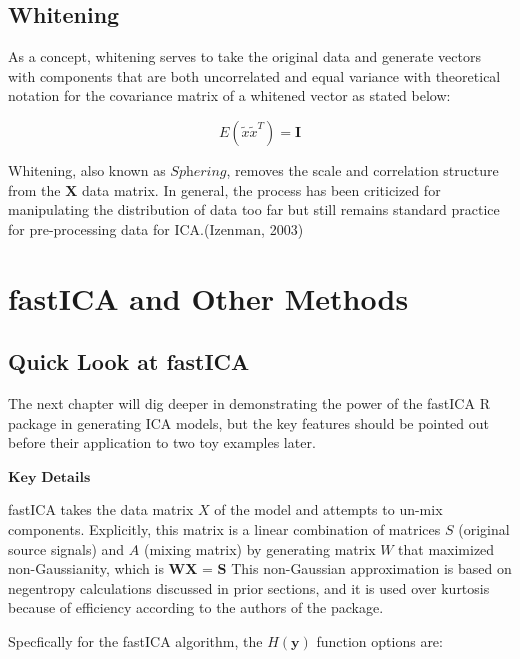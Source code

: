 \documentclass[12pt,twoside]{amherstthesis}
\begin{document}
  \subsection{Whitening}\label{whitening}
  
  As a concept, whitening serves to take the original data and generate
  vectors with components that are both uncorrelated and equal variance
  with theoretical notation for the covariance matrix of a whitened vector
  as stated below:
  
  \[ E(\tilde{x} \tilde{x}^T)= \textbf{I} \]
  
  Whitening, also known as \(\textit{Sphering}\), removes the scale and
  correlation structure from the \(\textbf{X}\) data matrix. In general,
  the process has been criticized for manipulating the distribution of
  data too far but still remains standard practice for pre-processing data
  for ICA.(Izenman, 2003)
  
  \section{fastICA and Other Methods}\label{fastica-and-other-methods}
  
  \subsection{Quick Look at fastICA}\label{quick-look-at-fastica}
  
  The next chapter will dig deeper in demonstrating the power of the
  fastICA R package in generating ICA models, but the key features should
  be pointed out before their application to two toy examples later.
  
  \(\textbf{Key Details}\) \newline
  
  fastICA takes the data matrix \(X\) of the model and attempts to un-mix
  components. Explicitly, this matrix is a linear combination of matrices
  \(S\) (original source signals) and \(A\) (mixing matrix) by generating
  matrix \(W\) that maximized non-Gaussianity, which is
  \(\textbf{WX = S}\) This non-Gaussian approximation is based on
  negentropy calculations discussed in prior sections, and it is used over
  kurtosis because of efficiency according to the authors of the package.
  
  Specfically for the fastICA algorithm, the \(H(\textbf{y})\) function
  options are: \newline
  
\end{document}
